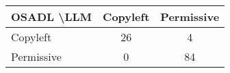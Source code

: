 \begin{tabular}{l|cc}\hline
	\textbf{OSADL \textbackslash LLM} & Copyleft & Permissive\\\hline
	Copyleft & 26 & 4\\
	Permissive & 0 & 84\\\hline
\end{tabular}
